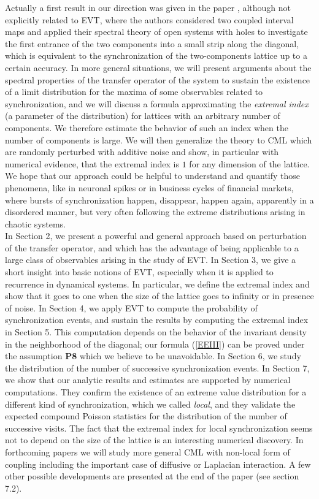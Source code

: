 \documentclass[12pt,reqno,a4paper]{amsart}
\begin{document}
Actually a first result in our direction was given in the paper \cite{CG}, although not explicitly related to EVT, where the authors considered two coupled interval maps and applied their spectral theory of   open systems with holes to investigate the first entrance of the two components into a small strip along the diagonal, which is equivalent to the synchronization of the two-components lattice up to a certain accuracy.
 In more general situations, we will present arguments
about the spectral properties of the transfer  operator of the system
to sustain the existence of a limit distribution for  the maxima of some observables related to synchronization, and we will discuss a formula approximating  the  {\em extremal index} (a parameter of the distribution)  for lattices with an arbitrary  number of  components.   We therefore estimate the  behavior of such an index  when the number of components is large. We will then generalize the theory to  CML which are  randomly perturbed with additive noise and show, in particular with numerical evidence,  that the extremal index is $1$ for any dimension of the lattice. We hope that our approach could be helpful to understand and quantify those  phenomena, like in neuronal spikes or in business cycles of financial markets, where bursts  of synchronization happen, disappear, happen again, apparently in a disordered manner, but very often following the extreme distributions arising in chaotic systems.\\




In Section 2, we present a powerful and general approach based on  perturbation of the transfer operator, and which has the advantage of being applicable to a large class of observables arising in the study of EVT. In Section 3, we give a short insight into basic notions of EVT, especially when it is applied to recurrence in dynamical systems. In particular, we define the extremal index and show that it goes to one when the size of the lattice goes to infinity or in presence of noise. In Section 4, we apply EVT to compute the probability of synchronization events, and sustain the results by computing  the extremal index in Section 5. This computation depends on the behavior of the invariant density in the neighborhood of the diagonal; our formula (\ref{EEIII}) can be proved under the assumption {\bf P8} which we believe to be unavoidable.  In Section 6, we study the distribution of the number of successive synchronization events. In Section 7, we  show that our analytic results and estimates  are supported  by numerical computations. They confirm the existence of an extreme value distribution for a different kind of synchronization, which we called {\em local}, and they validate the expected compound Poisson statistics for the distribution of the number of successive  visits.  The fact that the extremal index for local synchronization seems not to depend on the size of the lattice   is an interesting numerical discovery. In forthcoming papers we will study more general CML with non-local form of coupling including the important case of diffusive or Laplacian interaction. A few other possible developments are presented at the end of the paper (see section 7.2).
\end{document}
